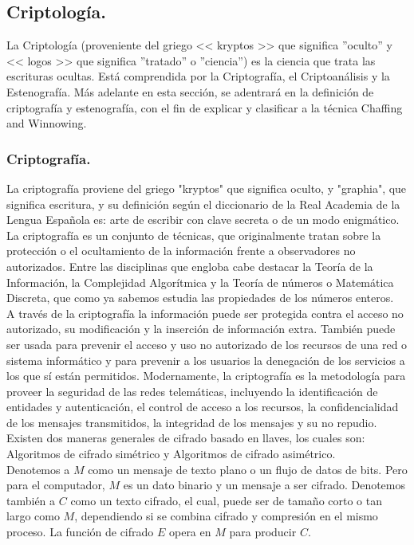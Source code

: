 \documentclass[12pt, a4paper, titlepage]{article}
\begin{document}
    	\subsection{Criptología.}
    	La Criptología (proveniente del griego << kryptos >> que significa ''oculto'' y << logos >> que significa ''tratado'' o ''ciencia'') es la ciencia que trata las escrituras ocultas. Está comprendida por la Criptografía, el Criptoanálisis y la Estenografía. Más adelante en esta sección, se adentrará en la definición de criptografía y estenografía, con el fin de explicar y clasificar a la técnica Chaffing and Winnowing.
    	
        \subsubsection{Criptografía.}
        La criptografía proviene del griego "kryptos" que significa oculto, y "graphia", que significa escritura, y su definición según el diccionario de la Real Academia de la Lengua Española es: arte de escribir con clave secreta o de un modo enigmático. La criptografía es un conjunto de técnicas, que originalmente tratan sobre la protección o el ocultamiento de la información frente a observadores no autorizados. Entre las disciplinas que engloba cabe destacar la Teoría de la Información, la Complejidad Algorítmica y la Teoría de números o Matemática Discreta, que como ya sabemos estudia las propiedades de los números enteros.\cite{refCryptography}\\

        A través de la criptografía la información puede ser protegida contra el acceso no autorizado, su modificación y la inserción de información extra. También puede ser usada para prevenir el acceso y uso no autorizado de los recursos de una red o sistema informático y para prevenir a los usuarios la denegación de los servicios a los que sí están permitidos. Modernamente, la criptografía es la metodología para proveer la seguridad de las redes telemáticas, incluyendo la identificación de entidades y autenticación, el control de acceso a los recursos, la confidencialidad de los mensajes transmitidos, la integridad de los mensajes y su no repudio. Existen dos maneras generales de cifrado basado en llaves, los cuales son: Algoritmos de cifrado simétrico y Algoritmos de cifrado asimétrico.\\
        
        Denotemos a $M$ como un mensaje de texto plano o un flujo de datos de bits. Pero para el computador, $M$ es un dato binario y un mensaje a ser cifrado. Denotemos también a $C$ como un texto cifrado, el cual, puede ser de tamaño corto o tan largo como $M$, dependiendo si se combina cifrado y compresión en el mismo proceso. La función de cifrado $E$ opera en $M$ para producir $C$.
		
\end{document}
